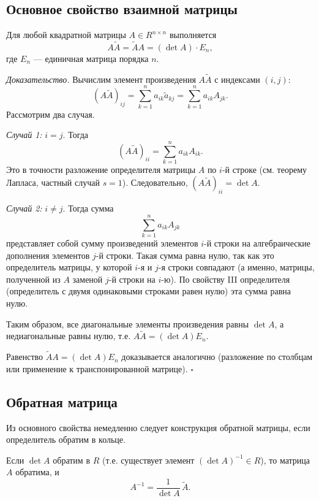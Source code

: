 \documentclass[a4paper,12pt]{article}
\theoremstyle{definition}
\theoremstyle{plain}
\theoremstyle{remark}
\begin{document}
	\subsection{Основное свойство взаимной матрицы}
	
	\begin{tcolorbox}[colback=green!5, colframe=green!50!black, title=Теорема]
		Для любой квадратной матрицы \( A \in R^{n \times n} \) выполняется
		\[
		A \tilde{A} = \tilde{A} A = (\det A) \cdot E_n,
		\]
		где \( E_n \) — единичная матрица порядка \( n \).
	\end{tcolorbox}
	
	\medskip
	\textit{Доказательство.}
	Вычислим элемент произведения \( A \tilde{A} \) с индексами \( (i, j) \):
	\[
	(A \tilde{A})_{ij} = \sum_{k=1}^{n} a_{ik} \tilde{a}_{kj} = \sum_{k=1}^{n} a_{ik} A_{jk}.
	\]
	Рассмотрим два случая.
	
	\textit{Случай 1:} \( i = j \). Тогда
	\[
	(A \tilde{A})_{ii} = \sum_{k=1}^{n} a_{ik} A_{ik}.
	\]
	Это в точности разложение определителя матрицы \( A \) по \( i \)-й строке (см. теорему Лапласа, частный случай \( s = 1 \)). Следовательно, \( (A \tilde{A})_{ii} = \det A \).
	
	\textit{Случай 2:} \( i \neq j \). Тогда сумма
	\[
	\sum_{k=1}^{n} a_{ik} A_{jk}
	\]
	представляет собой сумму произведений элементов \( i \)-й строки на алгебраические дополнения элементов \( j \)-й строки. Такая сумма равна нулю, так как это определитель матрицы, у которой \( i \)-я и \( j \)-я строки совпадают (а именно, матрицы, полученной из \( A \) заменой \( j \)-й строки на \( i \)-ю). По свойству III определителя (определитель с двумя одинаковыми строками равен нулю) эта сумма равна нулю.
	
	Таким образом, все диагональные элементы произведения равны \( \det A \), а недиагональные равны нулю, т.е. \( A \tilde{A} = (\det A) E_n \).
	
	Равенство \( \tilde{A} A = (\det A) E_n \) доказывается аналогично (разложение по столбцам или применение к транспонированной матрице). \hfill \(\square\)
	
	\subsection{Обратная матрица}
	
	Из основного свойства немедленно следует конструкция обратной матрицы, если определитель обратим в кольце.
	
	\begin{tcolorbox}[colback=red!5, colframe=red!50!black, title=Следствие (Формула обратной матрицы)]
		Если \( \det A \) обратим в \( R \) (т.е. существует элемент \( (\det A)^{-1} \in R \)), то матрица \( A \) обратима, и
		\[
		A^{-1} = \frac{1}{\det A} \, \tilde{A}.
		\]
	\end{tcolorbox}
	
\end{document}
